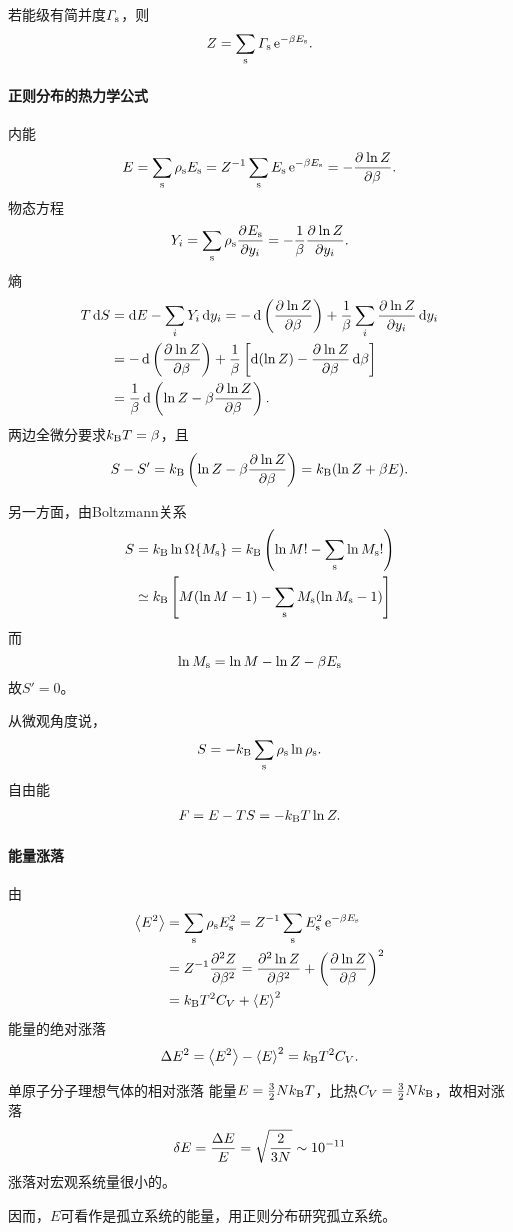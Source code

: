 若能级有简并度$\varGamma_\st$，则 
\begin{align}
	Z=\sum_\st\varGamma_\st\e{-\beta E_\st}.
\end{align}
\paragraph{正则分布的热力学公式}内能
\begin{align}
	E=\sum_\st\rho_\st E_\st=Z^{-1}\sum_\st E_\st\e{-\beta E_\st}=-\pv{\ln Z}\beta.
\end{align}
物态方程
\begin{align}
	Y_i=\sum_\st\rho_\st\pv{E_\st}{y_i}=-\frac1\beta\pv{\ln Z}{y_i}.
\end{align}
熵
\begin{align*}
	T\d S&=\d E-\sum_i Y_i\d y_i=-\d\kh{\pv{\ln Z}\beta}+\frac1\beta\sum_i\pv{\ln Z}{y_i}\d y_i\\
	&=-\d\kh{\pv{\ln Z}\beta}+\frac1\beta\fkh{\d(\ln Z)-\pv{\ln Z}\beta\d\beta}\\
	&=\frac1\beta\d\kh{\ln Z-\beta\pv{\ln Z}\beta}.
\end{align*}
两边全微分要求$\kB T=\beta$，且 
\begin{align}
	S-S'=\kB\kh{\ln Z-\beta\pv{\ln Z}\beta}=\kB(\ln Z+\beta E).
\end{align}

另一方面，由Boltzmann关系
\begin{align*}
	S&=\kB\ln\Omega\{M_\st\}=\kB\kh{\ln M!-\sum_\st\ln M_\st!}\\
	&\simeq\kB\fkh{M(\ln M-1)-\sum_\st M_\st(\ln M_\st-1)}
\end{align*}
而
\[
	\ln M_\st=\ln M-\ln Z-\beta E_\st
\]
故$S'=0$。

从微观角度说，
\begin{align}
	S=-\kB\sum_\st\rho_\st\ln\rho_\st.
\end{align}
自由能
\begin{align}
	F=E-TS=-\kB T\ln Z.
\end{align}
\paragraph{能量涨落}由
\begin{align*}
	\ave{E^2}&=\sum_\st\rho_\st E_\st^2=Z^{-1}\sum_\st E_\st^2\e{-\beta E_\st}\\
	&=Z^{-1}\pv[2]Z\beta=\pv[2]{\ln Z}\beta+\kh{\pv{\ln Z}\beta}^2\\
	&=\kB T^2C_V+\ave E^2
\end{align*}
能量的绝对涨落
\begin{align}
	\D E^2=\ave{E^2}-\ave E^2=\kB T^2C_V.
\end{align}
\begin{example}{单原子分子理想气体的相对涨落}{}
	能量$E=\frac32 N\kB T$，比热$C_V=\frac32N\kB$，故相对涨落
	\[
		\vd E=\frac{\D E}E=\sqrt{\frac2{3N}}\sim 10^{-11}
	\]
	涨落对宏观系统量很小的。
\end{example}
因而，$E$可看作是孤立系统的能量，用正则分布研究孤立系统。
